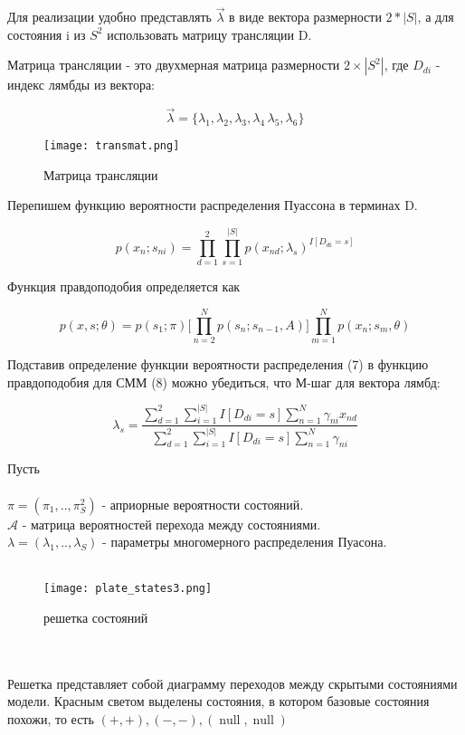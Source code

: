 \documentclass{matmex-diploma}
\begin{document}
Для реализации удобно представлять $\vec{\lambda}$ в виде вектора размерности $2 * |S|$, а для состояния i из $S^2$ использовать матрицу трансляции D.

Матрица трансляции - это двухмерная матрица размерности $2 \times |S^2|$, где $D_{di}$ - индекс лямбды из вектора:

$$\vec{\lambda}=\{\lambda_1, \lambda_2, \lambda_3, \lambda_4\, \lambda_5, \lambda_6\}$$

\begin{figure}[h]
\label{разрыв_функции}
\centering
\texttt{[image: transmat.png]}
\caption{Матрица трансляции}
\end{figure}

Перепишем функцию вероятности распределения Пуассона в терминах D.

\begin{equation}p(x_n;s_{ni}) = \prod\limits_{d = 1}^2 \prod\limits_{s = 1}^{|S|} p(x_{nd};\lambda_s)^{I[D_{di} = s]}\end{equation}

Функция правдоподобия определяется как

\begin{equation}p(x,s;\theta) = p(s_1;\pi)\bigg[\prod_{n=2}^N p(s_n;s_{n-1},A)\bigg]\prod_{m=1}^N p(x_n;s_m,\theta)\end{equation}

Подставив определение функции вероятности распределения (7) в функцию правдоподобия для СММ (8) можно убедиться, что М-шаг для вектора лямбд:

\begin{equation}\lambda_s = \frac{\sum\limits_{d = 1}^2 \sum\limits_{i = 1}^{|S|} I[D_{di} = s] \sum\limits_{n = 1}^N \gamma_{ni} x_{nd}}
                 {\sum\limits_{d = 1}^2 \sum\limits_{i = 1}^{|S|} I[D_{di} = s] \sum\limits_{n = 1}^N \gamma_{ni}}\end{equation}

Пусть
\\\\
$\pi = (\pi_1,..,\pi_S^2)$ - априорные вероятности состояний.
\\
$\mathcal{A}$ - матрица вероятностей перехода между состояниями.
\\
$\lambda = (\lambda_1,..,\lambda_S)$ - параметры многомерного распределения Пуасона.
\\\\
\begin{figure}[h]
\label{разрыв_функции}
\centering
\texttt{[image: plate\_states3.png]}
\caption{решетка состояний}
\end{figure}
\\\\
Решетка представляет собой диаграмму переходов между скрытыми состояниями модели. Красным светом выделены состояния, в котором базовые состояния похожи, то есть $(+,+),(-,-),(\operatorname{null},\operatorname{null})$
\end{document}
